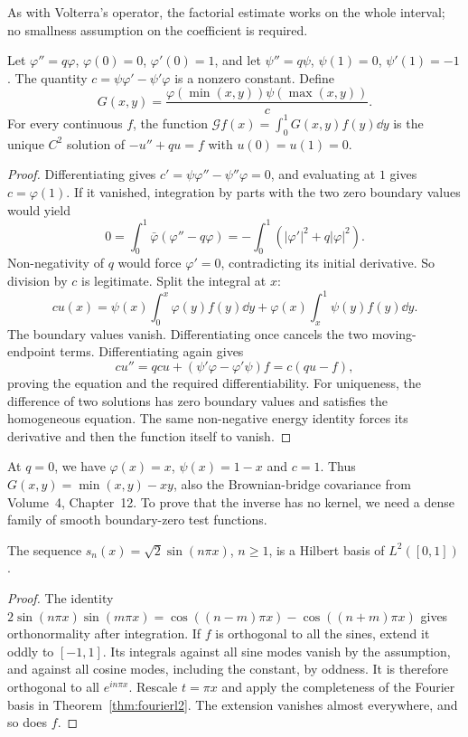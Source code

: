As with Volterra's operator, the factorial estimate works on the whole interval; no smallness assumption on the coefficient is required.

\begin{lemma}\label{lem:green}
Let $\varphi''=q\varphi$, $\varphi(0)=0$, $\varphi'(0)=1$, and let $\psi''=q\psi$, $\psi(1)=0$, $\psi'(1)=-1$. The quantity $c=\psi\varphi'-\psi'\varphi$ is a nonzero constant. Define
\[
G(x,y)=\frac{\varphi(\min(x,y))\psi(\max(x,y))}{c}.
\]
For every continuous $f$, the function $\mathcal Gf(x)=\int_0^1G(x,y)f(y)\dd y$ is the unique $C^2$ solution of $-u''+qu=f$ with $u(0)=u(1)=0$.
\end{lemma}
\begin{proof}
Differentiating gives $c'=\psi\varphi''-\psi''\varphi=0$, and evaluating at $1$ gives $c=\varphi(1)$. If it vanished, integration by parts with the two zero boundary values would yield
\[
0=\int_0^1\bar\varphi(\varphi''-q\varphi)
=-\int_0^1(|\varphi'|^2+q|\varphi|^2).
\]
Non-negativity of $q$ would force $\varphi'=0$, contradicting its initial derivative. So division by $c$ is legitimate.
Split the integral at $x$:
\[
cu(x)=\psi(x)\int_0^x\varphi(y)f(y)\dd y
+\varphi(x)\int_x^1\psi(y)f(y)\dd y.
\]
The boundary values vanish. Differentiating once cancels the two moving-endpoint terms. Differentiating again gives
\[
cu''=qcu+(\psi'\varphi-\varphi'\psi)f=c(qu-f),
\]
proving the equation and the required differentiability. For uniqueness, the difference of two solutions has zero boundary values and satisfies the homogeneous equation. The same non-negative energy identity forces its derivative and then the function itself to vanish.
\end{proof}

At $q=0$, we have $\varphi(x)=x$, $\psi(x)=1-x$ and $c=1$. Thus $G(x,y)=\min(x,y)-xy$, also the Brownian-bridge covariance from Volume~4, Chapter~12. To prove that the inverse has no kernel, we need a dense family of smooth boundary-zero test functions.

\begin{lemma}\label{lem:sines}
The sequence $s_n(x)=\sqrt2\sin(n\pi x)$, $n\ge1$, is a Hilbert basis of $L^2([0,1])$.
\end{lemma}
\begin{proof}
The identity $2\sin(n\pi x)\sin(m\pi x)=\cos((n-m)\pi x)-\cos((n+m)\pi x)$ gives orthonormality after integration. If $f$ is orthogonal to all the sines, extend it oddly to $[-1,1]$. Its integrals against all sine modes vanish by the assumption, and against all cosine modes, including the constant, by oddness. It is therefore orthogonal to all $e^{in\pi x}$. Rescale $t=\pi x$ and apply the completeness of the Fourier basis in Theorem~\ref{thm:fourierl2}. The extension vanishes almost everywhere, and so does $f$.
\end{proof}

